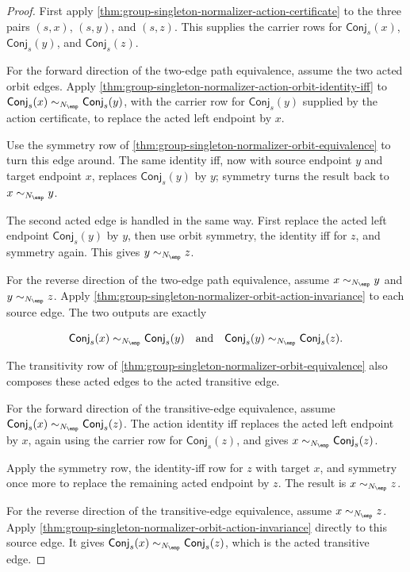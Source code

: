 \begin{proof}
First apply \autoref{thm:group-singleton-normalizer-action-certificate} to the
three pairs $(s,x)$, $(s,y)$, and $(s,z)$. This supplies the carrier rows for
$\mathsf{Conj}_s(x)$, $\mathsf{Conj}_s(y)$, and $\mathsf{Conj}_s(z)$.

For the forward direction of the two-edge path equivalence, assume the two
acted orbit edges. Apply
\autoref{thm:group-singleton-normalizer-action-orbit-identity-iff} to
$\mathsf{Conj}_s(x)\sim_{N_{\emp}}\mathsf{Conj}_s(y)$, with the carrier row for
$\mathsf{Conj}_s(y)$ supplied by the action certificate, to replace the acted
left endpoint by $x$.

Use the symmetry row of
\autoref{thm:group-singleton-normalizer-orbit-equivalence} to turn this edge
around. The same identity iff, now with source endpoint $y$ and target endpoint
$x$, replaces $\mathsf{Conj}_s(y)$ by $y$; symmetry turns the result back to
$x\sim_{N_{\emp}}y$.

The second acted edge is handled in the same way. First replace the acted left
endpoint $\mathsf{Conj}_s(y)$ by $y$, then use orbit symmetry, the identity iff
for $z$, and symmetry again. This gives $y\sim_{N_{\emp}}z$.

For the reverse direction of the two-edge path equivalence, assume
$x\sim_{N_{\emp}}y$ and $y\sim_{N_{\emp}}z$. Apply
\autoref{thm:group-singleton-normalizer-orbit-action-invariance} to each source
edge. The two outputs are exactly

$$
\mathsf{Conj}_s(x)\sim_{N_{\emp}}\mathsf{Conj}_s(y)
\quad\text{and}\quad
\mathsf{Conj}_s(y)\sim_{N_{\emp}}\mathsf{Conj}_s(z).
$$

The transitivity row of
\autoref{thm:group-singleton-normalizer-orbit-equivalence} also composes these
acted edges to the acted transitive edge.

For the forward direction of the transitive-edge equivalence, assume
$\mathsf{Conj}_s(x)\sim_{N_{\emp}}\mathsf{Conj}_s(z)$. The action identity iff
replaces the acted left endpoint by $x$, again using the carrier row for
$\mathsf{Conj}_s(z)$, and gives $x\sim_{N_{\emp}}\mathsf{Conj}_s(z)$.

Apply the symmetry row, the identity-iff row for $z$ with target $x$, and
symmetry once more to replace the remaining acted endpoint by $z$. The result is
$x\sim_{N_{\emp}}z$.

For the reverse direction of the transitive-edge equivalence, assume
$x\sim_{N_{\emp}}z$. Apply
\autoref{thm:group-singleton-normalizer-orbit-action-invariance} directly to
this source edge. It gives
$\mathsf{Conj}_s(x)\sim_{N_{\emp}}\mathsf{Conj}_s(z)$, which is the acted
transitive edge.
\end{proof}

